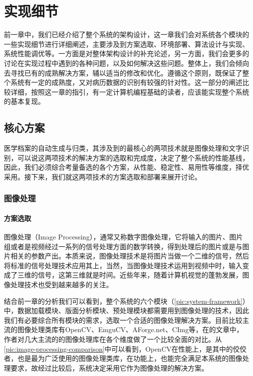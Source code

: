 \chapter{实现细节}
\label{chap:implements}
前一章中，我们已经介绍了整个系统的架构设计，这一章我们会对系统各个模块的一些实现细节进行详细阐述，主要涉及到方案选取、环境部署、算法设计与实现、系统性能调优等。一方面是对整体架构设计的补充论述，另一方面，我们会更多的讨论在实现过程中遇到的各种问题，以及如何解决这些问题。整体上，我们会倾向去寻找已有的成熟解决方案，辅以适当的修改和优化。遵循这个原则，既保证了整个系统有一定的成熟度，又对病历数据的识别有较强的针对性。这一部分的阐述比较详细，按照这一章的指引，有一定计算机编程基础的读者，应该能实现整个系统的基本复现。

\section{核心方案}
医学档案的自动生成与归类，其涉及到的最核心的两项技术就是图像处理和文字识别，可以说这两项技术的解决方案的选取和完成度，决定了整个系统的性能基线，因此，我们必须综合考量备选的各个方案，从性能、稳定性、易用性等维度，择优采用。接下来，我们就这两项技术的方案选取和部署来展开讨论。

\subsection{图像处理}
\subsubsection*{方案选取}
图像处理（Image Processing），通常又称数字图像处理，它将输入的图片、图片组或者是视频经过一系列的信号处理方面的数学转换，得到处理后的图片或是与图片相关的参数产出\citep{gonzalez2008digital}。本质来说，图像处理技术是将图片当做一个二维的信号，然后将标准的信号处理技术应用其上，当然，当图像处理技术运用到视频中时，输入变成了三维的信号，这第三维就是时间。近些年来，随着计算机视觉的蓬勃发展，图像处理技术也受到越来越多的关注。

结合前一章的分析我们可以看到，整个系统的六个模块（\autoref{pic:system-framework}）中，数据加载模块、版面分析模块、预处理模块都需要用到图像处理的技术，因此我们有必要综合所有模块的需求，选取一个合适的图像处理解决方案。目前比较主流的图像处理类库有OpenCV\citep{bradski2008OpenCV}、EmguCV\citep{Shi013emgu}、AForge.net\citep{Kirillov2013Aforge}、CImg\citep{tschumperle2012cimg}等，在\citep{XianrongWang}的文章中，作者对几大主流的的图像处理库在各个维度做了一个比较全面的对比。从\autoref{pic:image-processing-comparison}中可以看到，OpenCV在性能上，是其中的佼佼者，也是最为广泛使用的图像处理类库，在功能上，也能完全满足本系统的图像处理要求，故经过比较后，系统决定采用它作为图像处理的解决方案。

